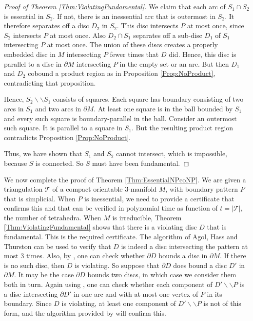 \documentclass[oneside]{amsart}
\numberwithin{equation}{section}
\theoremstyle{plain}
\theoremstyle{definition}
\newcommand{\calT}{{\mathcal{T}}}
\newcommand{\cut}{\backslash\backslash}
\begin{document}
\begin{proof}[Proof of Theorem \ref{Thm:ViolatingFundamental}]
We claim that each arc of $S_1 \cap S_2$ is essential in $S_2$. If not, there is an 
inessential arc that is outermost in $S_2$. It therefore separates off a disc $D_2$ in $S_2$.
This disc intersects $P$ at most once, since $S_2$ intersects $P$ at most once.
Also $D_2 \cap S_1$ separates off a sub-disc $D_1$ of $S_1$ intersecting $P$ at most once.
The union of these discs creates a properly embedded disc in $M$ intersecting
$P$ fewer times that $D$ did. Hence, this disc is parallel to a disc in $\partial M$
intersecting $P$ in the empty set or an arc. But then $D_1$ and $D_2$ cobound
a product region as in Proposition \ref{Prop:NoProduct}, contradicting that proposition.

Hence, $S_2 \cut S_1$ consists of squares. Each square has boundary consisting of two
arcs in $S_1$ and two arcs in $\partial M$. At least one square is 
in the ball bounded by $S_1$ and every such square is boundary-parallel in the ball. 
Consider an outermost such square. It is  parallel to a square in $S_1$. But the resulting product region contradicts
Proposition \ref{Prop:NoProduct}. 

Thus, we have shown that $S_1$ and $S_2$ cannot intersect, which is impossible, because
$S$ is connected. So $S$ must have been fundamental.
\end{proof}

We now complete the proof of Theorem \ref{Thm:EssentialNPcoNP}. We are given 
a triangulation $\calT$ of a compact orientable 3-manifold $M$, with boundary pattern
$P$ that is simplicial. When $P$ is inessential, we need to provide a certificate
that confirms this and that can be verified in polynomial time as function of $t= |\calT|$,
the number of tetrahedra. When $M$ is irreducible, Theorem \ref{Thm:ViolatingFundamental}
shows that there is a violating disc $D$ that is fundamental. This is the required certificate.
The algorithm of Agol, Hass and Thurston \cite{AgolHassThurston} can be used to verify that $D$ is indeed
a disc intersecting the pattern at most 3 times. Also, by \cite[Theorem 9.4]{Lackenby:EfficientCertification},
one can check whether $\partial D$ bounds a disc in $\partial M$. If there is no such disc,
then $D$ is violating. So suppose that $\partial D$ does bound a disc $D'$ in $\partial M$.
It may be the case $\partial D$ bounds two discs, in which case we consider them both in 
turn. Again using \cite[Theorem 9.4]{Lackenby:EfficientCertification}, one can check whether 
each component of $D' \cut P$ is a disc intersecting $\partial D'$ in one arc and
with at most one vertex of $P$ in its boundary. Since $D$ is violating, at least one
component of $D' \cut P$ is not of this form, and the algorithm provided by \cite[Theorem 9.4]{Lackenby:EfficientCertification}
will confirm this.
\end{document}
